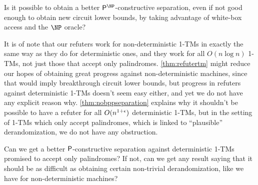 \begin{question}
Is it possible to obtain a better $\PTIME^\NP$-constructive separation, even if not good enough to obtain new circuit lower
bounds, by taking advantage of white-box access and the $\NP$ oracle?
\end{question}

It is of note that our refuters work for non-deterministic 1-TMs in exactly the same way as they do for deterministic ones,
and they work for all $O(n \log n)$ 1-TMs, not just those that accept only palindromes. 
\cref{thm:refutertm} might reduce our hopes of obtaining great progress against non-deterministic machines, 
since that would imply breakthrough circuit lower bounds, but progress in refuters against deterministic 1-TMs doesn't seem
easy either, and yet we do not have any explicit reason why. \cref{thm:nobppseparation} explains why it shouldn't be possible
to have a refuter for all $O(n^{1+\epsilon})$ deterministic 1-TMs, but in the setting of 1-TMs which only accept palindromes,
which is linked to ``plausible'' derandomization, we do not have any obstruction. 

\begin{question}
Can we get a better $\mathsf{P}$-constructive separation against deterministic 1-TMs promised to accept only 
palindromes? If not, can we get any result saying that it should be as difficult as obtaining certain non-trivial derandomization,
like we have for non-deterministic machines?
\end{question}



